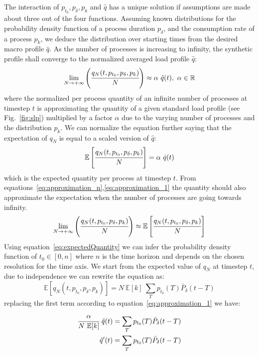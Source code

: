 \documentclass[conference]{IEEEtran}
\begin{document}
The interaction of $p_{t_0}, p_{\delta}, p_k$ and $\hat q$ has a unique solution if assumptions are made about three out of the four functions.
Assuming known distributions for the probability density function of a process duration $p_{\delta}$, and the consumption rate of a process $p_k$, we deduce the distribution over starting times from the desired macro profile $\hat q$. As the number of processes is increasing to infinity, the synthetic profile shall converge to the normalized averaged load profile $\hat{q}$:
\begin{equation}\label{eq:approximation_n}
\lim_{N \rightarrow + \infty} \left( \cfrac{q_N(t, p_{t_0}, p_{\delta}, p_k)}{N} \right) \approx \alpha~\hat{q}(t),~\alpha \in \mathbb{R}
\end{equation}
where the normalized per process quantity of an infinite number of processes at timestep $t$ is approximating the quantity of a given standard load profile (see Fig.~\ref{fig:slp}) multiplied by a factor $\alpha$ due to the varying number of processes and the distribution $p_k$. We can normalize the equation further saying that the expectation of $q_N$ is equal to a scaled version of $\hat{q}$: 
\begin{equation}\label{eq:approximation_1}
\mathbb{E}\left[ \cfrac{q_N(t, p_{t_0}, p_{\delta}, p_k)}{N} \right] = \alpha~\hat{q}(t)
\end{equation}
which is the expected quantity per process at timestep $t$. From equations~\eqref{eq:approximation_n},\eqref{eq:approximation_1} the quantity should also approximate the expectation when the number of processes are going towards infinity.
\begin{equation}\label{eq:approximation}
\lim_{N \rightarrow + \infty} \left( \cfrac{q_N(t, p_{t_0}, p_{\delta}, p_k)}{N} \right) \approx \mathbb{E}\left[ \cfrac{q_N(t, p_{t_0}, p_{\delta}, p_k)}{N} \right]
\end{equation}
Using equation~\eqref{eq:expectedQuantity} we can infer the probability density function of $t_0 \in [0, n]$ where $n$ is the time horizon and depends on the chosen resolution for the time axis. We start from the expected value of $q_N$ at timestep $t$, due to independence we can rewrite the equation as:
\begin{equation}
\mathbb{E}\left[ q_N(t, p_{t_0}, p_{\delta}, p_k) \right] = N~\mathbb{E}[k]~\sum_{T} p_{t_0}(T) \bar{P}_{\delta} (t-T)
\end{equation}
replacing the first term according to equation~\eqref{eq:approximation_1} we have:
\begin{align}
\cfrac{\alpha}{N~\mathbb{E}[k]}~\hat{q}(t) &= \sum_{T} p_{t_0}(T) \bar{P}_{\delta} (t-T)\\
\hat{q}'(t) &= \sum_{T} p_{t_0}(T) \bar{P}_{\delta} (t-T) \label{eq:infer_t_0}
\end{align}
\end{document}
